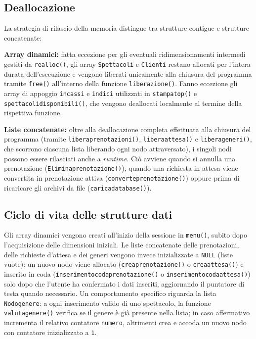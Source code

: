 \documentclass[11pt,a4paper,oneside,openany]{book}
\newenvironment{listacomp}{%
    \small
    \begin{list}{\textendash}{%
        \setlength{\topsep}{2pt}%
        \setlength{\partopsep}{0pt}%
        \setlength{\itemsep}{1pt}%
        \setlength{\parsep}{0pt}%
        \setlength{\leftmargin}{1.2em}%
    }%
}{%
    \end{list}%
}
\begin{document}
\subsection{Deallocazione}
La strategia di rilascio della memoria distingue tra strutture contigue e strutture concatenate:
\begin{listacomp}
    \item \textbf{Array dinamici:} fatta eccezione per gli eventuali ridimensionamenti intermedi gestiti da \texttt{realloc()}, gli array \texttt{Spettacoli} e \texttt{Clienti} restano allocati per l'intera durata dell'esecuzione e vengono liberati unicamente alla chiusura del programma tramite \texttt{free()} all'interno della funzione \texttt{liberazione()}. Fanno eccezione gli array di appoggio \texttt{incassi} e \texttt{indici} utilizzati in \texttt{stampatop()} e \texttt{spettacolidisponibili()}, che vengono deallocati localmente al termine della rispettiva funzione.
    \item \textbf{Liste concatenate:} oltre alla deallocazione completa effettuata alla chiusura del programma (tramite \texttt{liberaprenotazioni()}, \texttt{liberaattesa()} e \texttt{liberageneri()}, che scorrono ciascuna lista liberando ogni nodo attraversato), i singoli nodi possono essere rilasciati anche a \emph{runtime}. Ciò avviene quando si annulla una prenotazione (\texttt{Eliminaprenotazione()}), quando una richiesta in attesa viene convertita in prenotazione attiva (\texttt{converteprenotazione()}) oppure prima di ricaricare gli archivi da file (\texttt{caricadatabase()}).
\end{listacomp}

\subsection{Ciclo di vita delle strutture dati}
Gli array dinamici vengono creati all'inizio della sessione in \texttt{menu()}, subito dopo l'acquisizione delle dimensioni iniziali. Le liste concatenate delle prenotazioni, delle richieste d'attesa e dei generi vengono invece inizializzate a \texttt{NULL} (liste vuote): un nuovo nodo viene allocato (\texttt{creaprenotazione()} o \texttt{creaattesa()}) e inserito in coda (\texttt{inserimentocodaprenotazione()} o \texttt{inserimentocodaattesa()}) solo dopo che l'utente ha confermato i dati inseriti, aggiornando il puntatore di testa quando necessario. Un comportamento specifico riguarda la lista \texttt{Nodogenere}: a ogni inserimento valido di uno spettacolo, la funzione \texttt{valutagenere()} verifica se il genere è già presente nella lista; in caso affermativo incrementa il relativo contatore \texttt{numero}, altrimenti crea e accoda un nuovo nodo con contatore inizializzato a \texttt{1}.
\end{document}

